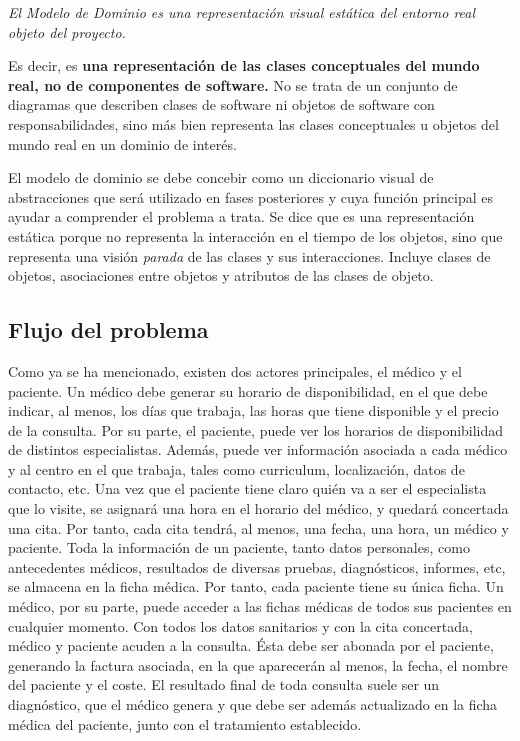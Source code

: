 \documentclass[a4paper,oneside,11pt]{book}
\begin{document}
{\it El Modelo de Dominio es una representación visual estática del entorno real objeto del proyecto.}

Es decir, es {\bf una representación de las clases conceptuales del mundo real, no de componentes de software.} No se trata de un conjunto de diagramas que describen clases de software ni objetos de software con responsabilidades, sino más bien representa las clases conceptuales u objetos del mundo real en un dominio de interés. 

El modelo de dominio  se debe concebir como un diccionario visual de abstracciones que será utilizado en fases posteriores y  cuya función principal es ayudar a comprender el problema a trata. Se dice que es una representación estática porque no representa la interacción en el tiempo de los objetos, sino que representa una visión \textit{parada} de las clases y sus interacciones. Incluye clases de objetos, asociaciones entre objetos y atributos de las clases de objeto.

\subsection{Flujo del problema}
	Como ya se ha mencionado, existen dos actores principales, el médico y el paciente. 
	Un médico debe generar su horario de disponibilidad, en el que debe indicar, al menos, los días que trabaja, las horas que tiene disponible y el precio de la consulta. Por su parte, el paciente, puede ver los horarios de disponibilidad de distintos especialistas. Además, puede ver información asociada a cada médico y al centro en el que trabaja, tales como curriculum, localización, datos de contacto, etc.
	Una vez que el paciente tiene claro quién va a ser el especialista que lo visite, se asignará una hora en el horario del médico, y quedará concertada una cita. Por tanto, cada cita tendrá, al menos, una fecha, una hora, un médico y paciente.
	Toda la información de un paciente, tanto datos personales, como antecedentes médicos, resultados de diversas pruebas, diagnósticos, informes, etc, se almacena en la ficha médica. Por tanto, cada paciente tiene su única ficha. Un médico, por su parte, puede acceder a las fichas médicas de todos sus pacientes en cualquier momento.
	Con todos los datos sanitarios y con la cita concertada, médico y paciente acuden a la consulta. Ésta debe ser abonada por el paciente, generando la factura asociada, en la que aparecerán al menos, la fecha, el nombre del paciente y el coste. El resultado final de toda consulta suele ser un diagnóstico, que el médico genera y que debe ser además actualizado en la ficha médica del paciente, junto con el tratamiento establecido.
\end{document}
